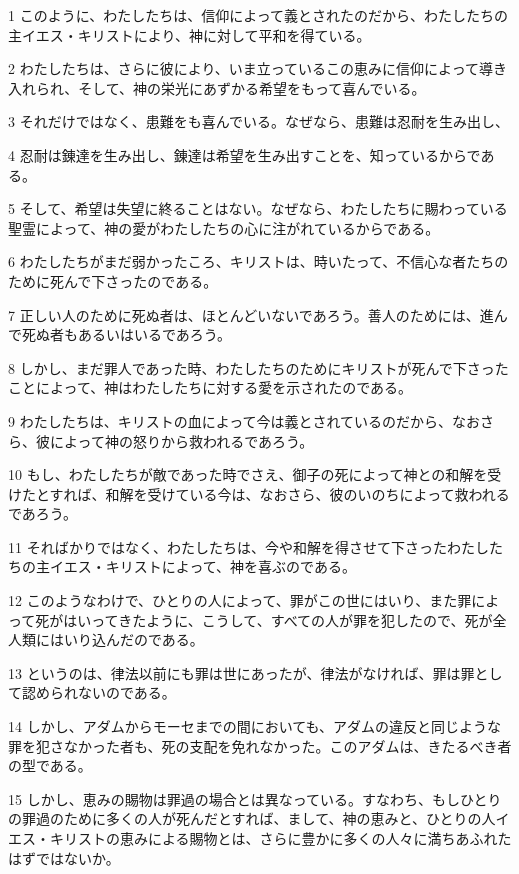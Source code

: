\par 1 このように、わたしたちは、信仰によって義とされたのだから、わたしたちの主イエス・キリストにより、神に対して平和を得ている。
\par 2 わたしたちは、さらに彼により、いま立っているこの恵みに信仰によって導き入れられ、そして、神の栄光にあずかる希望をもって喜んでいる。
\par 3 それだけではなく、患難をも喜んでいる。なぜなら、患難は忍耐を生み出し、
\par 4 忍耐は錬達を生み出し、錬達は希望を生み出すことを、知っているからである。
\par 5 そして、希望は失望に終ることはない。なぜなら、わたしたちに賜わっている聖霊によって、神の愛がわたしたちの心に注がれているからである。
\par 6 わたしたちがまだ弱かったころ、キリストは、時いたって、不信心な者たちのために死んで下さったのである。
\par 7 正しい人のために死ぬ者は、ほとんどいないであろう。善人のためには、進んで死ぬ者もあるいはいるであろう。
\par 8 しかし、まだ罪人であった時、わたしたちのためにキリストが死んで下さったことによって、神はわたしたちに対する愛を示されたのである。
\par 9 わたしたちは、キリストの血によって今は義とされているのだから、なおさら、彼によって神の怒りから救われるであろう。
\par 10 もし、わたしたちが敵であった時でさえ、御子の死によって神との和解を受けたとすれば、和解を受けている今は、なおさら、彼のいのちによって救われるであろう。
\par 11 そればかりではなく、わたしたちは、今や和解を得させて下さったわたしたちの主イエス・キリストによって、神を喜ぶのである。
\par 12 このようなわけで、ひとりの人によって、罪がこの世にはいり、また罪によって死がはいってきたように、こうして、すべての人が罪を犯したので、死が全人類にはいり込んだのである。
\par 13 というのは、律法以前にも罪は世にあったが、律法がなければ、罪は罪として認められないのである。
\par 14 しかし、アダムからモーセまでの間においても、アダムの違反と同じような罪を犯さなかった者も、死の支配を免れなかった。このアダムは、きたるべき者の型である。
\par 15 しかし、恵みの賜物は罪過の場合とは異なっている。すなわち、もしひとりの罪過のために多くの人が死んだとすれば、まして、神の恵みと、ひとりの人イエス・キリストの恵みによる賜物とは、さらに豊かに多くの人々に満ちあふれたはずではないか。
